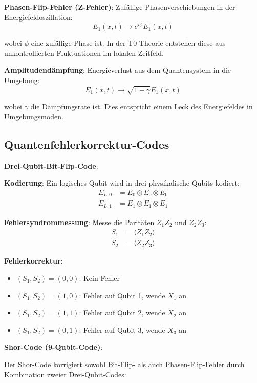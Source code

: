 \documentclass[12pt,a4paper]{article}
\theoremstyle{definition}
\theoremstyle{remark}
\begin{document}
\textbf{Phasen-Flip-Fehler (Z-Fehler)}:
Zuf{\"a}llige Phasenverschiebungen in der Energiefeldoszillation:
\begin{equation}
	E_1(x,t) \rightarrow e^{i\phi} E_1(x,t)
\end{equation}

wobei $\phi$ eine zuf{\"a}llige Phase ist. In der T0-Theorie entstehen diese aus unkontrollierten Fluktuationen im lokalen Zeitfeld.

\textbf{Amplitudend{\"a}mpfung}:
Energieverlust aus dem Quantensystem in die Umgebung:
\begin{equation}
	E_1(x,t) \rightarrow \sqrt{1-\gamma} E_1(x,t)
\end{equation}

wobei $\gamma$ die D{\"a}mpfungsrate ist. Dies entspricht einem Leck des Energiefeldes in Umgebungsmoden.

\subsection{Quantenfehlerkorrektur-Codes}

\textbf{Drei-Qubit-Bit-Flip-Code}:

\textbf{Kodierung}:
Ein logisches Qubit wird in drei physikalische Qubits kodiert:
\begin{align}
	E_{L,0} &= E_0 \otimes E_0 \otimes E_0 \\
	E_{L,1} &= E_1 \otimes E_1 \otimes E_1
\end{align}

\textbf{Fehlersyndrommessung}:
Messe die Parit{\"a}ten $Z_1 Z_2$ und $Z_2 Z_3$:
\begin{align}
	S_1 &= \langle Z_1 Z_2 \rangle \\
	S_2 &= \langle Z_2 Z_3 \rangle
\end{align}

\textbf{Fehlerkorrektur}:
\begin{itemize}
	\item $(S_1, S_2) = (0, 0)$: Kein Fehler
	\item $(S_1, S_2) = (1, 0)$: Fehler auf Qubit 1, wende $X_1$ an
	\item $(S_1, S_2) = (1, 1)$: Fehler auf Qubit 2, wende $X_2$ an  
	\item $(S_1, S_2) = (0, 1)$: Fehler auf Qubit 3, wende $X_3$ an
\end{itemize}

\textbf{Shor-Code (9-Qubit-Code)}:

Der Shor-Code korrigiert sowohl Bit-Flip- als auch Phasen-Flip-Fehler durch Kombination zweier Drei-Qubit-Codes:
\end{document}
